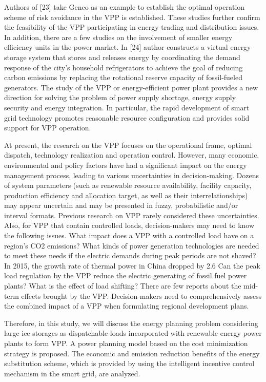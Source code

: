\documentclass[twocolumn,a4paper]{IEEEtran}
\begin{document}
Authors of [23] take Genco as an example to establish the optimal operation scheme of risk avoidance in the VPP is established. These studies further confirm the feasibility of the VPP participating in energy trading and distribution issues. 
In addition, there are a few studies on the involvement of smaller energy efficiency units in the power market. In [24] author constructs a virtual energy storage system that stores and releases energy by coordinating the demand response of the city's household refrigerators to achieve the goal of reducing carbon emissions by replacing the rotational reserve capacity of fossil-fueled generators. 
The study of the VPP or energy-efficient power plant provides a new direction for solving the problem of power supply shortage, energy supply security and energy integration. 
In particular, the rapid development of smart grid technology promotes reasonable resource configuration and provides solid support for VPP operation.

At present, the research on the VPP focuses on the operational frame, optimal dispatch, technology realization and operation control. 
However, many economic, environmental and policy factors have had a significant impact on the energy management process, leading to various uncertainties in decision-making. 
Dozens of system parameters (such as renewable resource availability, facility capacity, production efficiency and allocation target, as well as their interrelationships) may appear uncertain and may be presented in fuzzy, probabilistic and/or interval formats. 
Previous research on VPP rarely considered these uncertainties. 
Also, for VPP that contain controlled loads, decision-makers may need to know the following issues. 
What impact does a VPP with a controlled load have on a region's CO2 emissions? 
What kinds of power generation technologies are needed to meet these needs if the electric demands during peak periods are not shaved? 
In 2015, the growth rate of thermal power in China dropped by 2.6%
Can the peak load regulation by the VPP reduce the electric generating of fossil fuel power plants? 
What is the effect of load shifting? 
There are few reports about the mid-term effects brought by the VPP. 
Decision-makers need to comprehensively assess the combined impact of a VPP when formulating regional development plans.

Therefore, in this study, we will discuss the energy planning problem considering large ice storages as dispatchable loads incorporated with renewable energy power plants to form VPP. 
A power planning model based on the cost minimization strategy is proposed. 
The economic and emission reduction benefits of the energy substitution scheme, which is provided by using the intelligent incentive control mechanism in the smart grid, are analyzed.
\end{document}
